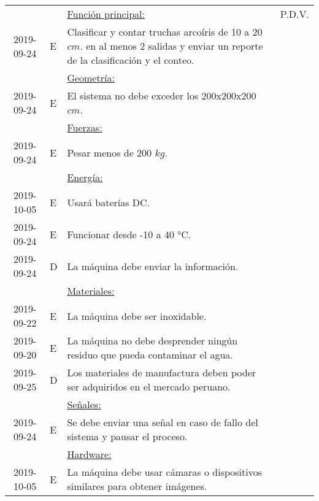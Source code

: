 \begin{savenotes}
\begin{longtable}{|c|p{0.6cm}|p{10cm}|c|}
		
		&    & \underline{Función principal:}																										& P.D.V. 	\\
		2019-09-24  & E  & Clasificar y contar truchas arcoíris de 10 a 20 $ cm $. en al menos 2 salidas y enviar un reporte de la clasificación y el conteo.   & \multicolumn{1}{l|}{}	\\ 
		&    & \underline{Geometría:}																												& \multicolumn{1}{l|}{}	\\
		2019-09-24  & E  & El sistema no debe exceder los 200x200x200 $ cm $.																					& \multicolumn{1}{l|}{}	\\ 
		&    & \underline{Fuerzas:}																													& \multicolumn{1}{l|}{}	\\
		2019-09-24  & E  & Pesar menos de 200 $ kg $.																											& \multicolumn{1}{l|}{}	\\ 
		&    & \underline{Energía:}																													& \multicolumn{1}{l|}{}	\\
		2019-10-05  & E  & Usará baterías DC.																													& \multicolumn{1}{l|}{}	\\ 	
		2019-09-24  & E  & Funcionar desde -10 a 40 °C.																											& \multicolumn{1}{l|}{}	\\ 	
		2019-09-24  & D  & La máquina debe enviar la información.																								& \multicolumn{1}{l|}{}	\\ 	
		&    & \underline{Materiales:}																												& \multicolumn{1}{l|}{}	\\
		2019-09-22  & E  & La máquina debe ser inoxidable.																										& \multicolumn{1}{l|}{}	\\ 	
		2019-09-20  & E  & La máquina no debe desprender ningún residuo que pueda contaminar el agua.															& \multicolumn{1}{l|}{}	\\ 	
		2019-09-25  & D  & Los materiales de manufactura deben poder ser adquiridos en el mercado peruano.														& \multicolumn{1}{l|}{}	\\ 			
		&    & \underline{Señales:}																													& \multicolumn{1}{l|}{}	\\
		2019-09-24  & E  & Se debe enviar una señal en caso de fallo del sistema y pausar el proceso.															& \multicolumn{1}{l|}{}	\\ 	
		&    & \underline{Hardware:}																												& \multicolumn{1}{l|}{}	\\
		2019-10-05  & E  & La máquina debe usar cámaras o dispositivos similares para obtener imágenes.															& \multicolumn{1}{l|}{}	\\ 		

\end{longtable}
\end{savenotes}
